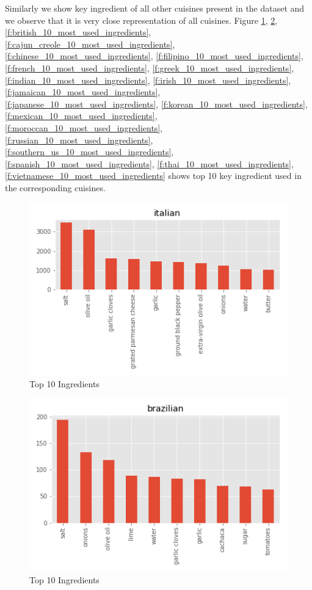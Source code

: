 \documentclass[sigconf]{acmart}
\begin{document}
Similarly we show key ingredient of all other cuisines present in the dataset and we observe that it is very close representation of all cuisines. Figure \ref{f:italian_10_most_used_ingredients}, \ref{f:brazilian_10_most_used_ingredients}, \ref{f:british_10_most_used_ingredients}, \ref{f:cajun_creole_10_most_used_ingredients}, \ref{f:chinese_10_most_used_ingredients}, \ref{f:filipino_10_most_used_ingredients}, \ref{f:french_10_most_used_ingredients}, \ref{f:greek_10_most_used_ingredients}, \ref{f:indian_10_most_used_ingredients}, \ref{f:irish_10_most_used_ingredients}, \ref{f:jamaican_10_most_used_ingredients}, \ref{f:japanese_10_most_used_ingredients}, \ref{f:korean_10_most_used_ingredients}, \ref{f:mexican_10_most_used_ingredients}, \ref{f:moroccan_10_most_used_ingredients}, \ref{f:russian_10_most_used_ingredients}, \ref{f:southern_us_10_most_used_ingredients}, \ref{f:spanish_10_most_used_ingredients}, \ref{f:thai_10_most_used_ingredients}, \ref{f:vietnamese_10_most_used_ingredients}  shows top 10 key ingredient used in the corresponding cuisines. 
\begin{figure}[!ht]
  \centering\includegraphics[width=\columnwidth]{images/italian_10_most_used_ingredients.png}
  \caption{Top 10 Ingredients }\label{f:italian_10_most_used_ingredients}
\end{figure}

\begin{figure}[!ht]
  \centering\includegraphics[width=\columnwidth]{images/brazilian_10_most_used_ingredients.png}
  \caption{Top 10 Ingredients }\label{f:brazilian_10_most_used_ingredients}
\end{figure}
\end{document}
